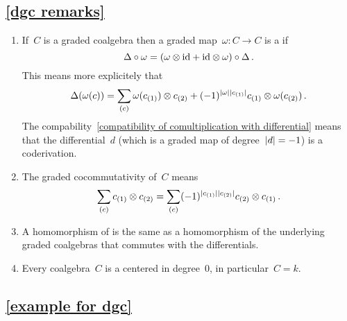 




\subsection{\cref{dgc remarks}}
\label{dgc remarks proof}

\begin{enumerate}
  \item
    If~$C$ is a graded coalgebra then a graded map~$\omega \colon C \to C$ is a  if
    \[
      \Delta \circ \omega
      =
      (\omega \otimes {\operatorname{id}} + {\operatorname{id}} \otimes \omega) \circ \Delta \,.
    \]
    This means more explicitely that
    \[
      \Delta(\omega(c))
      =
      \sum_{(c)}
        \omega(c_{(1)}) \otimes c_{(2)}
      + (-1)^{\lvert\omega\rvert \lvert c_{(1)}\rvert} c_{(1)} \otimes \omega( c_{(2)} ) \,.
    \]
    The compability~\eqref{compatibility of comultiplication with differential} means that the differential~$d$ (which is a graded map of degree~$\lvert d\rvert = -1$) is a coderivation.
  \item
    The graded cocommutativity of~$C$ means
    \[
      \sum_{(c)} c_{(1)} \otimes c_{(2)}
      =
      \sum_{(c)} (-1)^{\lvert c_{(1)}\rvert \lvert c_{(2)}\rvert} c_{(2)} \otimes c_{(1)} \,.
    \]
  \item
    A homomorphism of {\dgcs} is the same as a homomorphism of the underlying graded coalgebras that commutes with the differentials.
  \item
    Every coalgebra~$C$ is a {\dgc} centered in degree~$0$, in particular~$C = k$.
\end{enumerate}





\subsection{\cref{example for dgc}}
\label{example for dgc proof}

